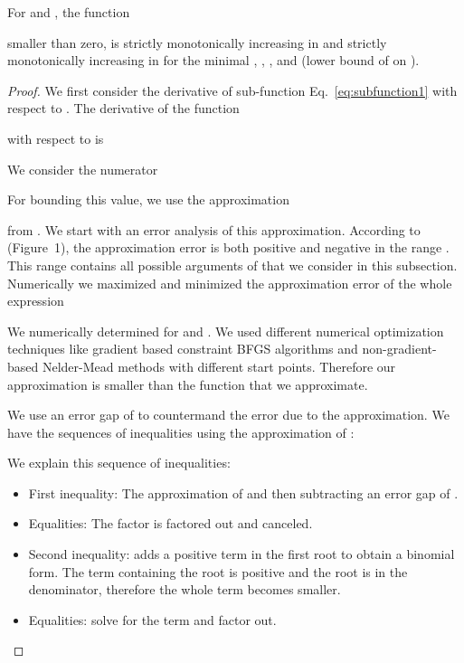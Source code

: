 \documentclass{article}
\begin{document}
\begin{lemma}
\label{proof:mainsubfunctionbelow} 
For  and , 
the function

smaller than zero, is strictly monotonically increasing in 
and strictly monotonically increasing in  for the minimal ,
, , and  (lower
bound of  on ).
\end{lemma}


\begin{proof}
We first consider the derivative of sub-function
Eq.~\eqref{eq:subfunction1} with respect to .
The derivative of the function 

with respect to  is
 


We consider the numerator


For bounding this value, we use the approximation 

from \citet{Ren:07}.
We start with an error analysis of this approximation.
According to \citet{Ren:07} (Figure~1), the approximation 
error is both positive and negative in the range
.  This range contains all possible
arguments of  that we consider in this subsection.
Numerically we maximized and minimized the approximation error of the
whole expression

We numerically determined  for 
 and . 
We used different numerical optimization techniques like  
gradient based constraint BFGS algorithms and 
non-gradient-based Nelder-Mead methods with different start points.
Therefore our approximation is smaller than the function that we
approximate. 

We use an error gap of  to countermand the error due to the
approximation. We have the sequences of inequalities using the approximation of 
\citet{Ren:07}:

We explain this sequence of inequalities:
\begin{itemize} 
\item First inequality: The approximation of \citet{Ren:07}
and then subtracting an error gap of .

\item Equalities: The factor  is factored out and
  canceled. 

\item Second inequality: adds a positive term in the first root to
  obtain a binomial form. The term containing the root 
is positive and the root is in the denominator, 
therefore the whole term becomes smaller.

\item Equalities: solve for the term and factor out.


\end{itemize}
\end{proof}
\end{document}
